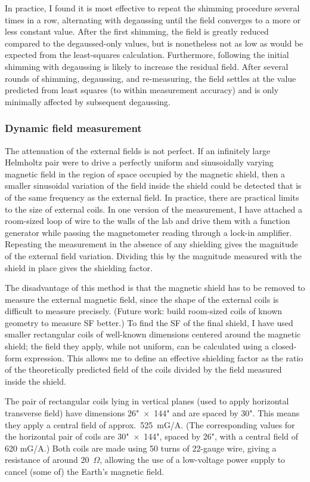 In practice, I found it is most effective to repeat the shimming procedure
several times in a row, alternating with degaussing until the field converges to
a more or less constant value. After the first shimming, the field is greatly
reduced compared to the degaussed-only values, but is nonetheless not as low as
would be expected from the least-squares calculation. Furthermore, following the
initial shimming with degaussing is likely to increase the residual field. After
several rounds of shimming, degaussing, and re-measuring, the field settles at
the value predicted from least squares (to within measurement accuracy) and is
only minimally affected by subsequent degaussing.

\subsubsection{Dynamic field measurement}

The attenuation of the external fields is not perfect. If an infinitely large
Helmholtz pair were to drive a perfectly uniform and sinusoidally
varying magnetic field in the region of space occupied by the magnetic
shield, then a smaller sinusoidal variation of the field inside the
shield could be detected that is of the same frequency as the external
field. In practice, there are practical limits to the size of external coils. In
one version of the measurement, I have attached a room-sized loop of
wire to the walls of the lab and drive them with a function generator while
passing the magnetometer reading through a lock-in amplifier. Repeating the
measurement in the absence of any shielding gives the magnitude of the
external field variation. Dividing this by the magnitude measured with
the shield in place gives the shielding factor.

The disadvantage of this method is that the magnetic shield has to be removed to
measure the external magnetic field, since the shape of the external coils is
difficult to measure precisely. (Future work: build room-sized coils of known
geometry to measure SF better.) To find the SF of the final shield, I have used
smaller rectangular coils of well-known dimensions centered around the magnetic
shield; the field they apply, while not uniform, can be calculated using a
closed-form expression. \cite[eqns~8--10]{hampton2020closed} This allows me to
define an effective shielding factor as the ratio of the theoretically predicted
field of the coils divided by the field measured inside the shield.

The pair of rectangular coils lying in vertical planes (used to apply horizontal
transverse field) have dimensions 26"~$\times$~144" and are spaced by 30". This
means they apply a central field of approx.\ 525~mG/A. (The corresponding values
for the horizontal pair of coils are 30"~$\times$~144", spaced by 26", with a
central field of 620 mG/A.) Both coils are made using 50 turns of 22-gauge wire,
giving a resistance of around 20~$\Omega$, allowing the use of a low-voltage
power supply to cancel (some of) the Earth's magnetic field.

